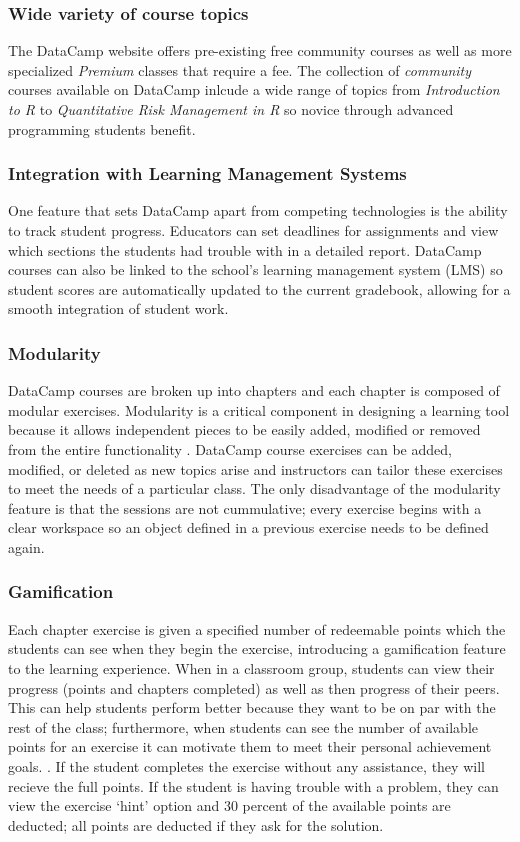 \documentclass[12pt]{article}\usepackage[]{graphicx}\usepackage[]{color}
\begin{document}
\subsubsection{Wide variety of course topics}
The DataCamp website offers pre-existing free community courses as well as more specialized \textit{Premium} classes that require a fee. 
The collection of \textit{community} courses available on DataCamp inlcude a wide range of topics from \textit{Introduction to R} to
\textit{Quantitative Risk Management in R} so novice through advanced programming students benefit.

\subsubsection{Integration with Learning Management Systems}
One feature that sets DataCamp apart from competing technologies is the ability to track student progress. Educators
can set deadlines for assignments and view which sections the
students had trouble with in a detailed report. DataCamp courses can also be linked to the school's learning management system (LMS) so student scores are automatically updated to the
current gradebook, allowing for a smooth integration of student work.

\subsubsection{Modularity}
DataCamp courses are broken up into chapters and each chapter is composed of modular exercises. Modularity is a critical component in designing a
learning tool because it allows independent pieces to be easily added, modified or removed from the entire functionality
\citep{Hare2017}. DataCamp course exercises can be added, modified, or deleted as new topics arise and instructors can tailor
these exercises to meet the needs of a particular class. The only disadvantage of the modularity feature is that the sessions
are not cummulative; every exercise begins with a clear workspace so an object defined in a previous exercise needs to be
defined again.

\subsubsection{Gamification}
Each chapter exercise is given a specified number of redeemable points which the students can see when they begin
the exercise, introducing a gamification feature to the learning experience. When in a classroom group, students can view their
progress (points and chapters completed) as well as then progress of their peers. This can help students perform better
because they want to be on par with the rest of the class; furthermore, when students can see the number of available points
for an exercise it can motivate them to meet their personal achievement goals. \citep{Chang2016}. If the student completes the exercise without
any assistance, they will recieve the full points. If the student is having trouble with a problem, they can view the exercise `hint' option and 30 percent
of the available points are deducted; all points are deducted if they ask for the solution. 
\end{document}
